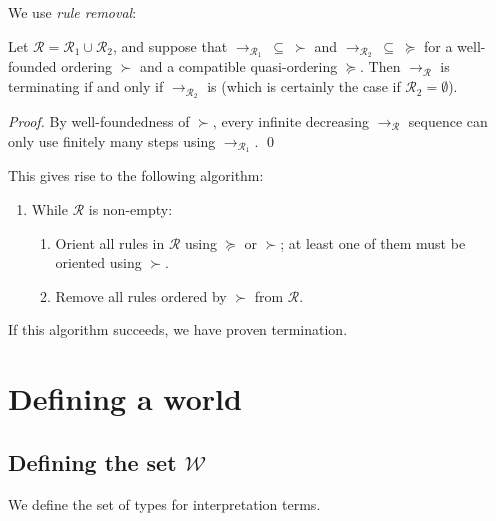 \documentclass[runningheads,a4paper]{llncs}
\newcommand{\World}{\mathcal{W}}
\newcommand{\Rules}{\mathcal{R}}
\newcommand{\arr}[1]{\to_{#1}}
\begin{document}
\renewcommand{\theenumii}{\alph{enumii}}

We use \emph{rule removal}:

\begin{theorem}
Let $\Rules = \Rules_1 \cup \Rules_2$, and suppose that $\arr{\Rules_1}\:
\subseteq\:\succ$ and $\arr{\Rules_2}\:\subseteq\:\succeq$ for a
well-founded ordering $\succ$ and a compatible quasi-ordering $\succeq$.
Then $\arr{\Rules}$ is terminating if and only if $\arr{\Rules_2}$ is
(which is certainly the case if $\Rules_2 = \emptyset$).
\end{theorem}

\begin{proof}
By well-foundedness of $\succ$, every infinite decreasing $\arr{\Rules}$
sequence can only use finitely many steps using $\arr{\Rules_1}$.
\qed
\end{proof}

This gives rise to the following algorithm:
\begin{enumerate}
\item While $\Rules$ is non-empty:
  \begin{enumerate}
  \item Orient all rules in $\Rules$ using $\succeq$ or $\succ$; at least
    one of them must be oriented using $\succ$.
  \item Remove all rules ordered by $\succ$ from $\Rules$.
  \end{enumerate}
\end{enumerate}
If this algorithm succeeds, we have proven termination.

\section{Defining a world}

\subsection{Defining the set $\World$}

We define the set of types for interpretation terms.
\end{document}
